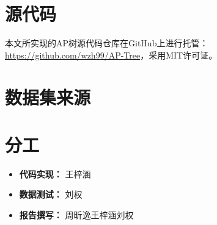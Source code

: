 \documentclass[UTF8]{ctexart}
\begin{document}
\begin{appendices}

\section{源代码}
本文所实现的AP树源代码仓库在GitHub上进行托管：\url{https://github.com/wzh99/AP-Tree}，采用MIT许可证。

\section{数据集来源}

\section{分工}
\begin{itemize}
    \item \textbf{代码实现：} 王梓涵
    \item \textbf{数据测试：} 刘权
    \item \textbf{报告撰写：} 周昕逸\quad 王梓涵\quad 刘权
\end{itemize}

\end{appendices}
\end{document}
